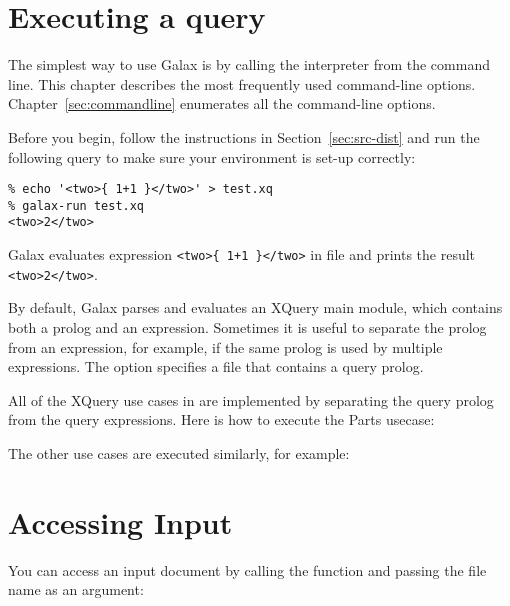 \section{Executing a query}

The simplest way to use Galax is by calling the 
interpreter from the command line.  This chapter describes the most
frequently used command-line options.  Chapter~\ref{sec:commandline}
enumerates all the command-line options.

Before you begin, follow the instructions in
Section~\ref{sec:src-dist} and run the following query to make sure
your environment is set-up correctly:
\begin{verbatim}
% echo '<two>{ 1+1 }</two>' > test.xq
% galax-run test.xq
<two>2</two>
\end{verbatim}

Galax evaluates expression \verb|<two>{ 1+1 }</two>| in file
 and prints the result \verb|<two>2</two>|.

By default, Galax parses and evaluates an XQuery main module, which
contains both a prolog and an expression.  Sometimes it is useful to
separate the prolog from an expression, for example, if the same
prolog is used by multiple expressions.   The  option
specifies a file that contains a query prolog.  

All of the XQuery use cases in  are
implemented by separating the query prolog from the query expressions.
Here is how to execute the Parts usecase:
\begin{alltt}
% cd $GALAXHOME/usecases 
% galax-run -context parts_context.xq parts_usecase.xq
\end{alltt}

The other use cases are executed similarly, for example:
\begin{alltt}
% galax-run -context rel_context.xq rel_usecase.xq
\end{alltt}

\section{Accessing Input}

You can access an input document by calling the
 function and passing the file name as an argument:
\begin{alltt}
% cd $GALAXHOME/usecases 
% echo 'fn:doc("docs/books.xml")' > doc.xq
% galax-run doc.xq
\end{alltt}


